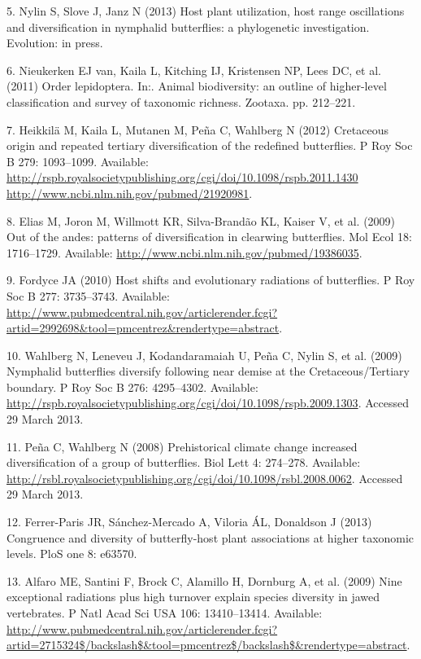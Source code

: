 \documentclass[10pt]{article}
\begin{document}
5. Nylin S, Slove J, Janz N (2013) Host plant utilization, host range
oscillations and diversification in nymphalid butterflies: a
phylogenetic investigation. Evolution: in press.

6. Nieukerken EJ van, Kaila L, Kitching IJ, Kristensen NP, Lees DC, et
al. (2011) Order lepidoptera. In:. Animal biodiversity: an outline of
higher-level classification and survey of taxonomic richness. Zootaxa.
pp. 212--221.

7. Heikkilä M, Kaila L, Mutanen M, Peña C, Wahlberg N (2012) Cretaceous
origin and repeated tertiary diversification of the redefined
butterflies. P Roy Soc B 279: 1093--1099. Available:
\href{http://rspb.royalsocietypublishing.org/cgi/doi/10.1098/rspb.2011.1430 http://www.ncbi.nlm.nih.gov/pubmed/21920981}{http://rspb.royalsocietypublishing.org/cgi/doi/10.1098/rspb.2011.1430
http://www.ncbi.nlm.nih.gov/pubmed/21920981}.

8. Elias M, Joron M, Willmott KR, Silva-Brandão KL, Kaiser V, et al.
(2009) Out of the andes: patterns of diversification in clearwing
butterflies. Mol Ecol 18: 1716--1729. Available:
\url{http://www.ncbi.nlm.nih.gov/pubmed/19386035}.

9. Fordyce JA (2010) Host shifts and evolutionary radiations of
butterflies. P Roy Soc B 277: 3735--3743. Available:
\url{http://www.pubmedcentral.nih.gov/articlerender.fcgi?artid=2992698\&tool=pmcentrez\&rendertype=abstract}.

10. Wahlberg N, Leneveu J, Kodandaramaiah U, Peña C, Nylin S, et al.
(2009) Nymphalid butterflies diversify following near demise at the
Cretaceous/Tertiary boundary. P Roy Soc B 276: 4295--4302. Available:
\url{http://rspb.royalsocietypublishing.org/cgi/doi/10.1098/rspb.2009.1303}.
Accessed 29 March 2013.

11. Peña C, Wahlberg N (2008) Prehistorical climate change increased
diversification of a group of butterflies. Biol Lett 4: 274--278.
Available:
\url{http://rsbl.royalsocietypublishing.org/cgi/doi/10.1098/rsbl.2008.0062}.
Accessed 29 March 2013.

12. Ferrer-Paris JR, Sánchez-Mercado A, Viloria ÁL, Donaldson J (2013)
Congruence and diversity of butterfly-host plant associations at higher
taxonomic levels. PloS one 8: e63570.

13. Alfaro ME, Santini F, Brock C, Alamillo H, Dornburg A, et al. (2009)
Nine exceptional radiations plus high turnover explain species diversity
in jawed vertebrates. P Natl Acad Sci USA 106: 13410--13414. Available:
\url{http://www.pubmedcentral.nih.gov/articlerender.fcgi?artid=2715324\$/backslash\$\&tool=pmcentrez\$/backslash\$\&rendertype=abstract}.
\end{document}
